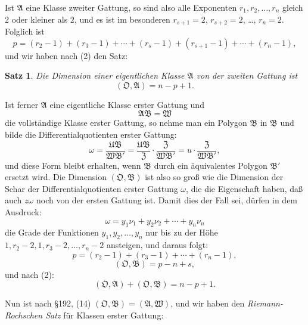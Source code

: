 \documentclass[12pt,a4paper]{article}
\newtheorem*{satz}{Satz}
\begin{document}
Ist $\mathfrak{A}$ eine Klasse zweiter Gattung, so sind also alle Exponenten $r_1, r_2, \ldots, r_n$ gleich $2$ oder kleiner als $2$, und es ist im besonderen $r_{s+1} = 2$, $r_{s+2} = 2$, \ldots, $r_n = 2$. Folglich ist
\[
p = (r_2 - 1) + (r_3 - 1) + \cdots + (r_s - 1) + (r_{s+1} - 1) + \cdots + (r_n - 1),
\]
und wir haben nach (2) den Satz:

\begin{satz}
Die Dimension einer eigentlichen Klasse $\mathfrak{A}$ von der zweiten Gattung ist
\begin{equation}\label{eq:199-3}
(\mathfrak{O}, \mathfrak{A}) = n - p + 1.
\end{equation}
\end{satz}

Ist ferner $\mathfrak{A}$ eine eigentliche Klasse erster Gattung und
\begin{equation}\label{eq:199-4}
\mathfrak{A}\mathfrak{B} = \mathfrak{W}
\end{equation}
die vollständige Klasse erster Gattung, so nehme man ein Polygon $\mathfrak{B}$ in $\mathfrak{B}$ und bilde die Differentialquotienten erster Gattung:
\[
\omega = \frac{\mathfrak{U}\mathfrak{B}}{\mathfrak{W}\mathfrak{B}'} = \frac{\mathfrak{U}\mathfrak{B}}{\mathfrak{Z}} \cdot \frac{\mathfrak{Z}}{\mathfrak{W}\mathfrak{B}'} = u \cdot \frac{\mathfrak{Z}}{\mathfrak{W}\mathfrak{B}'},
\]
und diese Form bleibt erhalten, wenn $\mathfrak{B}$ durch ein äquivalentes Polygon $\mathfrak{B}'$ ersetzt wird. Die Dimension $(\mathfrak{O}, \mathfrak{B})$ ist also so groß wie die Dimension der Schar der Differentialquotienten erster Gattung $\omega$, die die Eigenschaft haben, daß auch $z\omega$ noch von der ersten Gattung ist. Damit dies der Fall sei, dürfen in dem Ausdruck:
\[
\omega = y_1\nu_1 + y_2\nu_2 + \cdots + y_n\nu_n
\]
die Grade der Funktionen $y_1, y_2, \ldots, y_n$ nur bis zu der Höhe $1, r_2 - 2, 1, r_3 - 2, \ldots, r_n - 2$ ansteigen, und daraus folgt:
\begin{equation}\label{eq:199-5}
p = (r_2 - 1) + (r_3 - 1) + \cdots + (r_n - 1),
\end{equation}
\begin{equation}\label{eq:199-5b}
(\mathfrak{O}, \mathfrak{B}) = p - n + s,
\end{equation}
und nach (2):
\[
(\mathfrak{O}, \mathfrak{A}) + (\mathfrak{O}, \mathfrak{B}) = n - p + 1.
\]

Nun ist nach \S 192, (14) $(\mathfrak{O}, \mathfrak{B}) = (\mathfrak{A}, \mathfrak{W})$, und wir haben den \emph{Riemann-Rochschen Satz} für Klassen erster Gattung:
\end{document}
